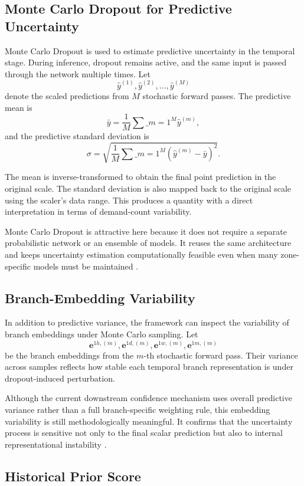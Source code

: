\documentclass[12pt,a4paper]{report}
\begin{document}
\subsection{Monte Carlo Dropout for Predictive Uncertainty}

Monte Carlo Dropout is used to estimate predictive uncertainty in the temporal stage. During inference, dropout remains active, and the same input is passed through the network multiple times. Let
\[
\hat{y}^{(1)}, \hat{y}^{(2)}, \dots, \hat{y}^{(M)}
\]
denote the scaled predictions from \(M\) stochastic forward passes. The predictive mean is
\[
\bar{y}
=
\frac{1}{M}\sum\_{m=1}^{M}\hat{y}^{(m)},
\]
and the predictive standard deviation is
\[
\sigma
=
\sqrt{
	\frac{1}{M}\sum\_{m=1}^{M}
	(\hat{y}^{(m)} - \bar{y})^2
}.
\]

The mean is inverse-transformed to obtain the final point prediction in the original scale. The standard deviation is also mapped back to the original scale using the scaler's data range. This produces a quantity with a direct interpretation in terms of demand-count variability.

Monte Carlo Dropout is attractive here because it does not require a separate probabilistic network or an ensemble of models. It reuses the same architecture and keeps uncertainty estimation computationally feasible even when many zone-specific models must be maintained \cite{gal2016dropout}.

\subsection{Branch-Embedding Variability}

In addition to predictive variance, the framework can inspect the variability of branch embeddings under Monte Carlo sampling. Let
\[
\mathbf{e}^{1h,(m)}, \mathbf{e}^{1d,(m)}, \mathbf{e}^{1w,(m)}, \mathbf{e}^{1m,(m)}
\]
be the branch embeddings from the \(m\)-th stochastic forward pass. Their variance across samples reflects how stable each temporal branch representation is under dropout-induced perturbation.

Although the current downstream confidence mechanism uses overall predictive variance rather than a full branch-specific weighting rule, this embedding variability is still methodologically meaningful. It confirms that the uncertainty process is sensitive not only to the final scalar prediction but also to internal representational instability \cite{gal2016dropout}.

\subsection{Historical Prior Score}
\end{document}
